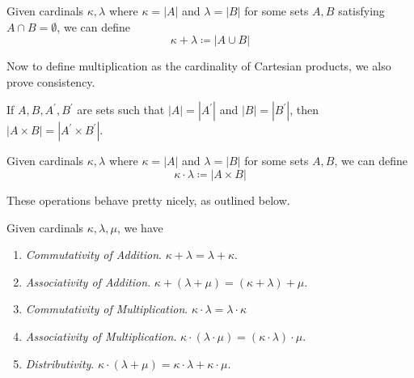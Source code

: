   \begin{definition}
    Given cardinals $\kappa, \lambda$ where $\kappa = |A|$ and $\lambda = |B|$ for some sets $A, B$ satisfying $A \cap B = \emptyset$, we can define 
    \begin{equation}
      \kappa + \lambda \coloneqq |A \cup B|
    \end{equation}
  \end{definition}

  Now to define multiplication as the cardinality of Cartesian products, we also prove consistency. 

  \begin{lemma} 
    If $A, B, A^\prime, B^\prime$ are sets such that $|A| = |A^\prime|$ and $|B| = |B^\prime|$, then $|A \times B| = |A^\prime \times B^\prime|$. 
  \end{lemma}

  \begin{definition}
    Given cardinals $\kappa, \lambda$ where $\kappa = |A|$ and $\lambda = |B|$ for some sets $A, B$, we can define 
    \begin{equation}
      \kappa \cdot \lambda \coloneqq |A \times B| 
    \end{equation}
  \end{definition}

  These operations behave pretty nicely, as outlined below. 

  \begin{theorem}
    Given cardinals $\kappa, \lambda, \mu$, we have 
    \begin{enumerate}
      \item \textit{Commutativity of Addition}. $\kappa + \lambda = \lambda + \kappa$. 
      \item \textit{Associativity of Addition}. $\kappa + (\lambda + \mu) = (\kappa + \lambda) + \mu$. 
      \item \textit{Commutativity of Multiplication}. $\kappa \cdot \lambda = \lambda \cdot \kappa$
      \item \textit{Associativity of Multiplication}. $\kappa \cdot (\lambda \cdot \mu) = (\kappa \cdot \lambda) \cdot \mu$. 
      \item \textit{Distributivity}. $\kappa \cdot (\lambda + \mu) = \kappa \cdot \lambda + \kappa \cdot \mu$. 
    \end{enumerate}
  \end{theorem}

